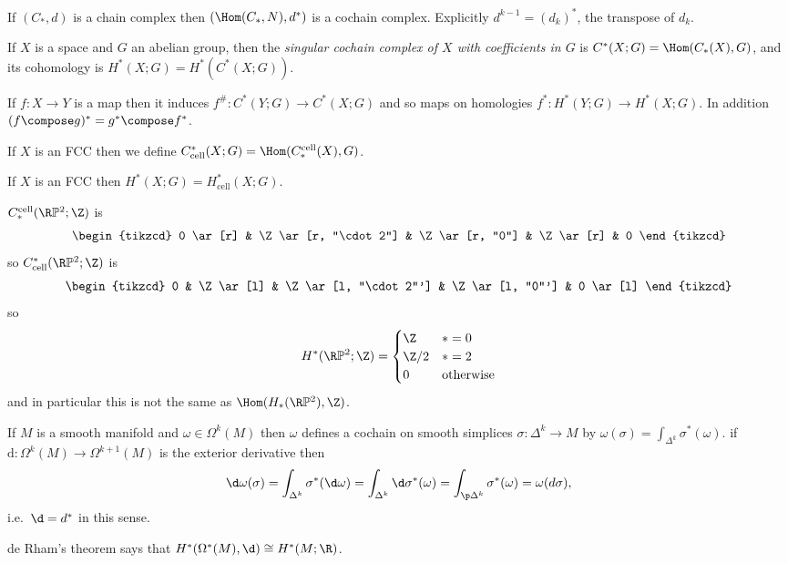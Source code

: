 \documentclass[a4paper]{article}
\renewcommand{\b}{\p}
\renewcommand*{\P}{\mathbb{P}}
\newcommand{\cell}{\mathrm{cell}}
\begin{document}
If \((C_*, d)\) is a chain complex then \((\Hom(C_*, N), d^*)\) is a cochain complex. Explicitly \(d^{k - 1} = (d_k)^*\), the transpose of \(d_k\).

\begin{definition}
  If \(X\) is a space and \(G\) an abelian group, then the \emph{singular cochain complex of \(X\) with coefficients in \(G\)} is \(C^*(X; G) = \Hom(C_*(X), G)\), and its cohomology is \(H^*(X; G) = H^*(C^*(X; G))\).
\end{definition}

If \(f: X \to Y\) is a map then it induces \(f^\#: C^*(Y; G) \to C^*(X; G)\) and so maps on homologies \(f^*: H^*(Y; G) \to H^*(X; G)\). In addition \((f \compose g)^* = g^* \compose f^*\).

If \(X\) is an FCC then we define \(C^*_\cell(X; G) = \Hom(C_*^\cell(X), G)\).

\begin{theorem}
  If \(X\) is an FCC then \(H^*(X; G) = H_\cell^*(X; G)\).
\end{theorem}

\begin{eg}
  \(C_*^\cell(\R\P^2; \Z)\) is
  \[
    \begin{tikzcd}
      0 \ar[r] & \Z \ar[r, "\cdot 2"] & \Z \ar[r, "0"] & \Z \ar[r] & 0
    \end{tikzcd}
  \]
  so \(C^*_\cell(\R\P^2; \Z)\) is
  \[
    \begin{tikzcd}
      0 & \Z \ar[l] & \Z \ar[l, "\cdot 2"'] & \Z \ar[l, "0"'] & 0 \ar[l]
    \end{tikzcd}
  \]
  so
  \[
    H^*(\R\P^2; \Z) =
    \begin{cases}
      \Z & * = 0 \\
      \Z/2 & * = 2 \\
      0 & \text{otherwise}
    \end{cases}
  \]
  and in particular this is not the same as \(\Hom(H_*(\R\P^2), \Z)\).
\end{eg}

\begin{eg}
  If \(M\) is a smooth manifold and \(\omega \in \Omega^k(M)\) then \(\omega\) defines a cochain on smooth simplices \(\sigma: \Delta^k \to M\) by \(\omega(\sigma) = \int_{\Delta^k} \sigma^*(\omega)\). if \(\mathrm d: \Omega^k(M) \to \Omega^{k + 1}(M)\) is the exterior derivative then
  \[
    \d \omega(\sigma) = \int_{\Delta^k} \sigma^*(\d \omega) = \int_{\Delta^k} \d \sigma^*(\omega) = \int_{\b \Delta^k} \sigma^*(\omega) = \omega(d \sigma),
  \]
  i.e.\ \(\d = d^*\) in this sense.

  de Rham's theorem says that \(H^*(\Omega^*(M), \d) \cong H^*(M; \R)\).
\end{eg}
\end{document}
